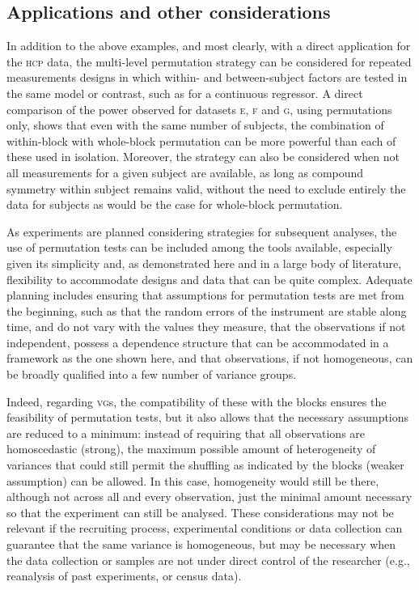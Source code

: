 \subsection{Applications and other considerations}

In addition to the above examples, and most clearly, with a direct application for the \textsc{hcp} data, the multi-level permutation strategy can be considered for repeated measurements designs in which within- and between-subject factors are tested in the same model or contrast, such as for a continuous regressor. A direct comparison of the power observed for datasets \textsc{e}, \textsc{f} and \textsc{g}, using permutations only, shows that even with the same number of subjects, the combination of within-block with whole-block permutation can be more powerful than each of these used in isolation. Moreover, the strategy can also be considered when not all measurements for a given subject are available, as long as compound symmetry within subject remains valid, without the need to exclude entirely the data for subjects as would be the case for whole-block permutation.

As experiments are planned considering strategies for subsequent analyses, the use of permutation tests can be included among the tools available, especially given its simplicity and, as demonstrated here and in a large body of literature, flexibility to accommodate designs and data that can be quite complex. Adequate planning includes ensuring that assumptions for permutation tests are met from the beginning, such as that the random errors of the instrument are stable along time, and do not vary with the values they measure, that the observations if not independent, possess a dependence structure that can be accommodated in a framework as the one shown here, and that observations, if not homogeneous, can be broadly qualified into a few number of variance groups.

Indeed, regarding \textsc{vg}s, the compatibility of these with the blocks ensures the feasibility of permutation tests, but it also allows that the necessary assumptions are reduced to a minimum: instead of requiring that all observations are homoscedastic (strong), the maximum possible amount of heterogeneity of variances that could still permit the shuffling as indicated by the blocks (weaker assumption) can be allowed. In this case, homogeneity would still be there, although not across all and every observation, just the minimal amount necessary so that the experiment can still be analysed. These considerations may not be relevant if the recruiting process, experimental conditions or data collection can guarantee that the same variance is homogeneous, but may be necessary when the data collection or samples are not under direct control of the researcher (e.g., reanalysis of past experiments, or census data).